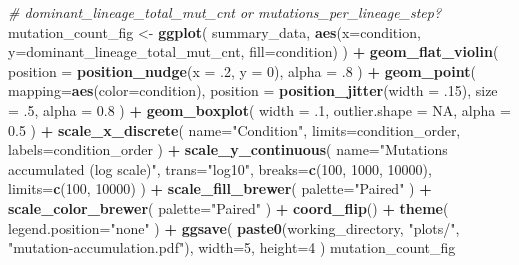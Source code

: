 \documentclass[]{book}
\newenvironment{Shaded}{\begin{snugshade}}{\end{snugshade}}
\newcommand{\CommentTok}[1]{\textcolor[rgb]{0.56,0.35,0.01}{\textit{#1}}}
\newcommand{\DataTypeTok}[1]{\textcolor[rgb]{0.13,0.29,0.53}{#1}}
\newcommand{\DecValTok}[1]{\textcolor[rgb]{0.00,0.00,0.81}{#1}}
\newcommand{\FloatTok}[1]{\textcolor[rgb]{0.00,0.00,0.81}{#1}}
\newcommand{\KeywordTok}[1]{\textcolor[rgb]{0.13,0.29,0.53}{\textbf{#1}}}
\newcommand{\NormalTok}[1]{#1}
\newcommand{\OperatorTok}[1]{\textcolor[rgb]{0.81,0.36,0.00}{\textbf{#1}}}
\newcommand{\OtherTok}[1]{\textcolor[rgb]{0.56,0.35,0.01}{#1}}
\newcommand{\StringTok}[1]{\textcolor[rgb]{0.31,0.60,0.02}{#1}}
\begin{document}
\begin{Shaded}
\begin{Highlighting}[]
\CommentTok{# dominant_lineage_total_mut_cnt or mutations_per_lineage_step?}
\NormalTok{mutation_count_fig <-}\StringTok{ }\KeywordTok{ggplot}\NormalTok{(}
\NormalTok{    summary_data,}
    \KeywordTok{aes}\NormalTok{(}\DataTypeTok{x=}\NormalTok{condition, }\DataTypeTok{y=}\NormalTok{dominant_lineage_total_mut_cnt, }\DataTypeTok{fill=}\NormalTok{condition)}
\NormalTok{  ) }\OperatorTok{+}
\StringTok{  }\KeywordTok{geom_flat_violin}\NormalTok{(}
    \DataTypeTok{position =} \KeywordTok{position_nudge}\NormalTok{(}\DataTypeTok{x =} \FloatTok{.2}\NormalTok{, }\DataTypeTok{y =} \DecValTok{0}\NormalTok{),}
    \DataTypeTok{alpha =} \FloatTok{.8}
\NormalTok{  ) }\OperatorTok{+}
\StringTok{  }\KeywordTok{geom_point}\NormalTok{(}
    \DataTypeTok{mapping=}\KeywordTok{aes}\NormalTok{(}\DataTypeTok{color=}\NormalTok{condition),}
    \DataTypeTok{position =} \KeywordTok{position_jitter}\NormalTok{(}\DataTypeTok{width =} \FloatTok{.15}\NormalTok{),}
    \DataTypeTok{size =} \FloatTok{.5}\NormalTok{,}
    \DataTypeTok{alpha =} \FloatTok{0.8}
\NormalTok{  ) }\OperatorTok{+}
\StringTok{  }\KeywordTok{geom_boxplot}\NormalTok{(}
    \DataTypeTok{width =} \FloatTok{.1}\NormalTok{,}
    \DataTypeTok{outlier.shape =} \OtherTok{NA}\NormalTok{,}
    \DataTypeTok{alpha =} \FloatTok{0.5}
\NormalTok{  ) }\OperatorTok{+}
\StringTok{  }\KeywordTok{scale_x_discrete}\NormalTok{(}
    \DataTypeTok{name=}\StringTok{"Condition"}\NormalTok{,}
    \DataTypeTok{limits=}\NormalTok{condition_order,}
    \DataTypeTok{labels=}\NormalTok{condition_order}
\NormalTok{  ) }\OperatorTok{+}
\StringTok{  }\KeywordTok{scale_y_continuous}\NormalTok{(}
    \DataTypeTok{name=}\StringTok{"Mutations accumulated (log scale)"}\NormalTok{,}
    \DataTypeTok{trans=}\StringTok{"log10"}\NormalTok{,}
    \DataTypeTok{breaks=}\KeywordTok{c}\NormalTok{(}\DecValTok{100}\NormalTok{, }\DecValTok{1000}\NormalTok{, }\DecValTok{10000}\NormalTok{),}
    \DataTypeTok{limits=}\KeywordTok{c}\NormalTok{(}\DecValTok{100}\NormalTok{, }\DecValTok{10000}\NormalTok{)}
\NormalTok{  ) }\OperatorTok{+}
\StringTok{  }\KeywordTok{scale_fill_brewer}\NormalTok{(}
    \DataTypeTok{palette=}\StringTok{"Paired"}
\NormalTok{  ) }\OperatorTok{+}
\StringTok{  }\KeywordTok{scale_color_brewer}\NormalTok{(}
    \DataTypeTok{palette=}\StringTok{"Paired"}
\NormalTok{  ) }\OperatorTok{+}
\StringTok{  }\KeywordTok{coord_flip}\NormalTok{() }\OperatorTok{+}
\StringTok{  }\KeywordTok{theme}\NormalTok{(}
    \DataTypeTok{legend.position=}\StringTok{"none"}
\NormalTok{  ) }\OperatorTok{+}
\StringTok{  }\KeywordTok{ggsave}\NormalTok{(}
    \KeywordTok{paste0}\NormalTok{(working_directory, }\StringTok{"plots/"}\NormalTok{, }\StringTok{"mutation-accumulation.pdf"}\NormalTok{),}
    \DataTypeTok{width=}\DecValTok{5}\NormalTok{,}
    \DataTypeTok{height=}\DecValTok{4}
\NormalTok{  )}
\NormalTok{mutation_count_fig}
\end{Highlighting}
\end{Shaded}
\end{document}
